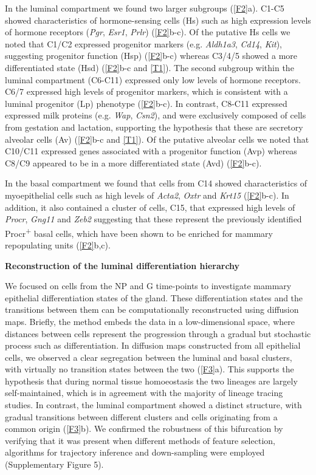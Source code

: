 \documentclass[titlepage, 12pt, oneside]{amsart}
\begin{document}
In the luminal compartment we found two larger subgroups (\autoref{F2}a).
C1-C5 showed characteristics of hormone-sensing cells (Hs) such as high expression levels of hormone receptors (\textit{Pgr}, \textit{Esr1}, \textit{Prlr}) (\autoref{F2}b-c).
Of the putative Hs cells we noted that C1/C2 expressed progenitor markers (e.g. \textit{Aldh1a3}, \textit{Cd14}, \textit{Kit})\autocite{Shehata2012}, suggesting progenitor function (Hsp) (\autoref{F2}b-c) whereas C3/4/5 showed a more differentiated state (Hsd) (\autoref{F2}b-c and \autoref{T1}).
The second subgroup within the luminal compartment (C6-C11) expressed only low levels of hormone receptors.
C6/7 expressed high levels of progenitor markers, which is consistent with a luminal progenitor (Lp) phenotype (\autoref{F2}b-c).
In contrast, C8-C11 expressed expressed milk proteins (e.g. \textit{Wap}, \textit{Csn2}), and were exclusively composed of cells from gestation and lactation, supporting the hypothesis that these are secretory alveolar cells (Av) (\autoref{F2}b-c and \autoref{T1}).
Of the putative alveolar cells we noted that C10/C11 expressed genes associated with a progenitor function (Avp) whereas C8/C9 appeared to be in a more differentiated state (Avd) (\autoref{F2}b-c).

In the basal compartment we found that cells from C14 showed characteristics of myoepithelial cells such as high levels of \textit{Acta2}, \textit{Oxtr} and \textit{Krt15} (\autoref{F2}b-c).
In addition, it also contained a cluster of cells, C15, that expressed high levels of \textit{Procr}, \textit{Gng11} and \textit{Zeb2} suggesting that these represent the previously identified Procr\textsuperscript{+}  basal cells, which have been shown to be enriched for mammary repopulating units\autocite{Wang2015} (\autoref{F2}b,c).

\textbf{Reconstruction of the luminal differentiation hierarchy}

We focused on cells from the NP and G time-points to investigate mammary epithelial differentiation states of the gland.
These differentiation states and the transitions between them can be computationally reconstructed using diffusion maps\autocite{Haghverdi2015}.
Briefly, the method embeds the data in a low-dimensional space, where distances between cells represent the progression through a gradual but stochastic process such as differentiation.
In diffusion maps constructed from all epithelial cells, we observed a clear segregation between the luminal and basal clusters, with virtually no transition states between the two (\autoref{F3}a).
This supports the hypothesis that during normal tissue homoeostasis the two lineages are largely self-maintained, which is in agreement with the majority of lineage tracing studies\autocite{VanKeymeulen2011,VanAmerongen2012,Davis2016}.
In contrast, the luminal compartment showed a distinct structure, with gradual transitions between different clusters and cells originating from a common origin (\autoref{F3}b).
We confirmed the robustness of this bifurcation by verifying that it was present when different methods of feature selection, algorithms for trajectory inference and down-sampling were employed (Supplementary Figure 5).
\end{document}
